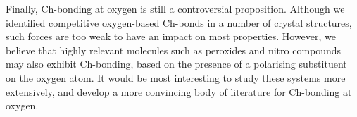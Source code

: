 \begin{refsection}
Finally, Ch-bonding at oxygen is still a controversial proposition.
Although we identified competitive oxygen-based Ch-bonds in a number of crystal structures, such forces are too weak to have an impact on most properties.
However, we believe that highly relevant molecules such as peroxides and nitro compounds may also exhibit Ch-bonding, based on the presence of a polarising substituent on the oxygen atom.
It would be most interesting to study these systems more extensively, and develop a more convincing body of literature for Ch-bonding at oxygen.


\printbibliography[heading=subbibliography]
\end{refsection}
